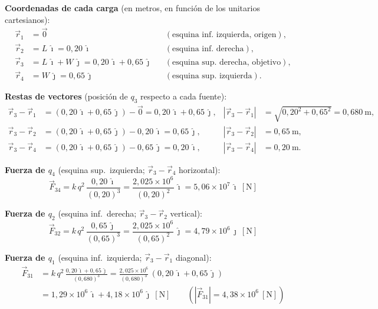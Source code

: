 \documentclass[12pt,letterpaper]{article}
\begin{document}
\medskip

\noindent\textbf{Coordenadas de cada carga} (en metros, en funci\'on de los unitarios cartesianos):
\begin{align*}
    \vec r_1 &= \vec 0 & &(\text{esquina inf.\ izquierda, origen}),\\
    \vec r_2 &= L\,\hat\imath = 0{,}20\,\hat\imath & &(\text{esquina inf.\ derecha}),\\
    \vec r_3 &= L\,\hat\imath + W\,\hat\jmath = 0{,}20\,\hat\imath + 0{,}65\,\hat\jmath & &(\text{esquina sup.\ derecha, objetivo}),\\
    \vec r_4 &= W\,\hat\jmath = 0{,}65\,\hat\jmath & &(\text{esquina sup.\ izquierda}).
\end{align*}

\noindent\textbf{Restas de vectores} (posici\'on de $q_3$ respecto a cada fuente):
\begin{align*}
    \vec r_3-\vec r_1 &= (0{,}20\,\hat\imath + 0{,}65\,\hat\jmath) - \vec 0 = 0{,}20\,\hat\imath + 0{,}65\,\hat\jmath,
        & |\vec r_3-\vec r_1| &= \sqrt{0{,}20^2+0{,}65^2} = 0{,}680\ \text{m},\\[2pt]
    \vec r_3-\vec r_2 &= (0{,}20\,\hat\imath + 0{,}65\,\hat\jmath) - 0{,}20\,\hat\imath = 0{,}65\,\hat\jmath,
        & |\vec r_3-\vec r_2| &= 0{,}65\ \text{m},\\[2pt]
    \vec r_3-\vec r_4 &= (0{,}20\,\hat\imath + 0{,}65\,\hat\jmath) - 0{,}65\,\hat\jmath = 0{,}20\,\hat\imath,
        & |\vec r_3-\vec r_4| &= 0{,}20\ \text{m}.
\end{align*}

\noindent\textbf{Fuerza de $q_4$} (esquina sup.\ izquierda; $\vec r_3-\vec r_4$ horizontal):
\[
    \vec F_{34} = k\,q^2\,\frac{0{,}20\,\hat\imath}{(0{,}20)^3}
    = \frac{2{,}025\times10^{6}}{(0{,}20)^2}\,\hat\imath = 5{,}06\times10^{7}\,\hat\imath\ [\text{N}]
\]

\noindent\textbf{Fuerza de $q_2$} (esquina inf.\ derecha; $\vec r_3-\vec r_2$ vertical):
\[
    \vec F_{32} = k\,q^2\,\frac{0{,}65\,\hat\jmath}{(0{,}65)^3}
    = \frac{2{,}025\times10^{6}}{(0{,}65)^2}\,\hat\jmath = 4{,}79\times10^{6}\,\hat\jmath\ [\text{N}]
\]

\noindent\textbf{Fuerza de $q_1$} (esquina inf.\ izquierda; $\vec r_3-\vec r_1$ diagonal):
\begin{align*}
    \vec F_{31} &= k\,q^2\,\frac{0{,}20\,\hat\imath + 0{,}65\,\hat\jmath}{(0{,}680)^3}
    = \frac{2{,}025\times10^{6}}{(0{,}680)^3}\,(0{,}20\,\hat\imath + 0{,}65\,\hat\jmath)\\[2pt]
    &= 1{,}29\times10^{6}\,\hat\imath + 4{,}18\times10^{6}\,\hat\jmath\ [\text{N}]
    \qquad(|\vec F_{31}| = 4{,}38\times10^{6}\ [\text{N}])
\end{align*}
\end{document}

